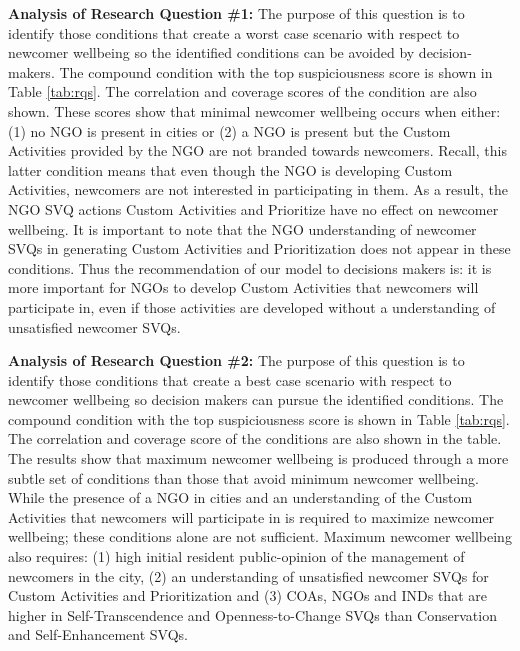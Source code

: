 \documentclass{scspaperproc}
\theoremstyle{scsthe}
\begin{document}
{\bf Analysis of Research Question \#1:} The purpose of this question is to identify those conditions that create a worst case scenario with respect to newcomer wellbeing so the identified conditions can be avoided by decision-makers. The compound condition with the top suspiciousness score is shown in Table \ref{tab:rqs}. The correlation and coverage scores of the condition are also shown. These scores show that minimal newcomer wellbeing occurs when either: (1) no NGO is present in cities or (2) a NGO is present but the Custom Activities provided by the NGO are not branded towards newcomers. Recall, this latter condition means that even though the NGO is developing Custom Activities, newcomers are not interested in participating in them. As a result, the NGO SVQ actions Custom Activities and Prioritize have no effect on newcomer wellbeing. It is important to note that the NGO understanding of newcomer SVQs in generating Custom Activities and Prioritization does not appear in these conditions. Thus the recommendation of our model to decisions makers is: it is more important for NGOs to develop Custom Activities that newcomers will participate in, even if those activities are developed without a understanding of unsatisfied newcomer SVQs. 

{\bf Analysis of Research Question \#2:} The purpose of this question is to identify those conditions that create a best case scenario with respect to newcomer wellbeing so decision makers can pursue the identified conditions. The compound condition with the top suspiciousness score is shown in Table \ref{tab:rqs}. The correlation and coverage score of the conditions are also shown in the table. The results show that maximum newcomer wellbeing is produced through a more subtle set of conditions than those that avoid minimum newcomer wellbeing. While the presence of a NGO in cities and an understanding of the Custom Activities that newcomers will participate in is required to maximize newcomer wellbeing; these conditions alone are not sufficient. Maximum newcomer wellbeing also requires: (1) high initial resident public-opinion of the management of newcomers in the city, (2) an understanding of unsatisfied newcomer SVQs for Custom Activities and Prioritization and (3) COAs, NGOs and INDs that are higher in Self-Transcendence and Openness-to-Change SVQs than Conservation and Self-Enhancement SVQs.
\end{document}

